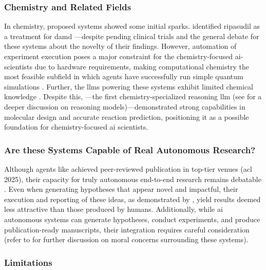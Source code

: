 \subsubsection{Chemistry and Related Fields}

In chemistry, proposed systems showed some initial sparks.  identified ripasudil as a treatment for \gls{damd} \autocite{ghareeb2025robin0}---despite pending clinical trials and the general debate for these systems about the novelty of their findings\autocite{Listgarten2024perpetual}.
However, automation of experiment execution poses a major constraint for the chemistry-focused \gls{ai}-scientists due to hardware requirements, making computational chemistry the most feasible subfield in which agents have successfully run simple quantum simulations \autocite{Zou2025ElAgente}. 
Further, the \glspl{llm} powering these systems exhibit limited chemical knowledge \autocite{mirza2024large}. 
Despite this,  \autocite{narayanan2025training}---the first chemistry-specialized reasoning \gls{llm} (see  for a deeper discussion on reasoning models)---demonstrated strong capabilities in molecular design and accurate reaction prediction, positioning it as a possible foundation for chemistry-focused \gls{ai} scientists.


\subsubsection{Are these Systems Capable of Real Autonomous Research?}

Although agents like  \autocite{intologyai2025zochi} achieved peer-reviewed publication in top-tier venues (\gls{acl} 2025), their capacity for truly autonomous end-to-end research remains debatable \autocite{son2025ai}. 
Even when generating hypotheses that appear novel and impactful, their execution and reporting of these ideas, as demonstrated by \textcite{si2025ideation1execution}, yield results deemed less attractive than those produced by humans.  
Additionally, while \gls{ai} autonomous systems can generate hypotheses, conduct experiments, and produce publication-ready manuscripts, their integration requires careful consideration (refer to  for further discussion on moral concerns surrounding these systems). 


\subsubsection{Limitations}

